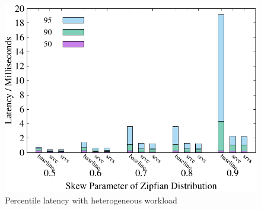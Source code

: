 \begin{figure}[t]
\begin{minipage}[b]{0.32\linewidth}
        \label{fig:weighted:abort}
    \end{minipage}
    \begin{minipage}[b]{0.32\linewidth}
            \centering
            \includegraphics[width=\textwidth]{./exp_fig/weighted_size/percent95_latency}
            \vspace{-2em}
            \caption{Percentile latency with heterogeneous workload}
            \label{fig:weighted:p95}
        \end{minipage}
\end{figure}
     
